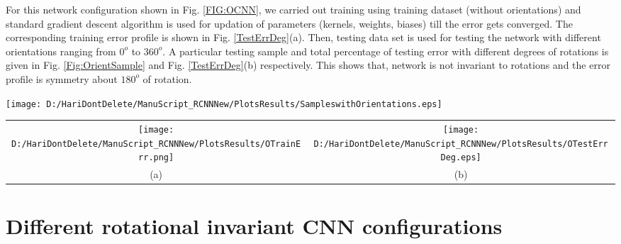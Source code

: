  For this network configuration shown in Fig. \ref{FIG:OCNN}, we carried out training using training dataset (without orientations) and standard gradient descent algorithm is used for updation of parameters (kernels, weights, biases) till the error gets converged. The corresponding training error profile is shown in Fig. \ref{TestErrDeg}(a). Then, testing data set is used for testing the network with different orientations ranging from $0^o$ to $360^o$. A particular testing sample and total percentage of testing error with different degrees of rotations is given in Fig. \ref{Fig:OrientSample} and Fig. \ref{TestErrDeg}(b) respectively. This shows that, network is not invariant to rotations and the error profile is symmetry about $180^o$ of rotation.\\


\begin{figure*}
 \centering
 \texttt{[image: D:/HariDontDelete/ManuScript\_RCNNNew/PlotsResults/SampleswithOrientations.eps]}
 \caption{Orientation of a particular test sample.}
 \label{Fig:OrientSample}
\end{figure*}

\begin{figure*}
\begin{tabular}{cc}
\texttt{[image: D:/HariDontDelete/ManuScript\_RCNNNew/PlotsResults/OTrainErr.png]}&\texttt{[image: D:/HariDontDelete/ManuScript\_RCNNNew/PlotsResults/OTestErrDeg.eps]}\\
(a)  & (b) \\
\end{tabular}
\caption{ Demonstration of rotational variancy of CNN;(a) Training error profile, (b) Percentage of Testing error Vs Degree of rotation}
\label{TestErrDeg}
\end{figure*}

\section{Different rotational invariant CNN configurations}
\label{AddDiffRotConfig}
